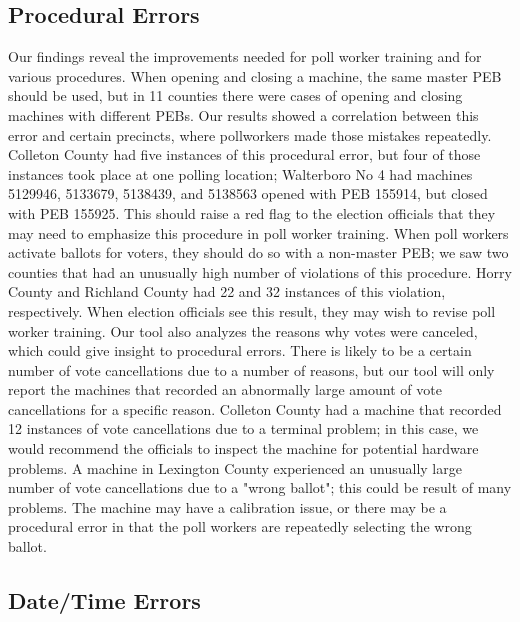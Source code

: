 \subsection{Procedural Errors}
Our findings reveal the improvements needed for poll worker training and for various procedures.  When opening and closing a machine, the same master PEB should be used, but in 11 counties there were cases of opening and closing machines with different PEBs.  Our results showed a correlation between this error and certain precincts, where pollworkers made those mistakes repeatedly.  Colleton County had five instances of this procedural error, but four of those instances took place at one polling location; Walterboro No 4 had machines 5129946, 5133679, 5138439, and 5138563 opened with PEB 155914, but closed with PEB 155925.  This should raise a red flag to the election officials that they may need to emphasize this procedure in poll worker training.  When poll workers activate ballots for voters, they should do so with a non-master PEB; we saw two counties that had an unusually high number of violations of this procedure.  Horry County and Richland County had 22 and 32 instances of this violation, respectively.  When election officials see this result, they may wish to revise poll worker training.  Our tool also analyzes the reasons why votes were canceled, which could give insight to procedural errors.  There is likely to be a certain number of vote cancellations due to a number of reasons, but our tool will only report the machines that recorded an abnormally large amount of vote cancellations for a specific reason.  Colleton County had a machine that recorded 12 instances of vote cancellations due to a terminal problem; in this case, we would recommend the officials to inspect the machine for potential hardware problems.  A machine in Lexington County experienced an unusually large number of vote cancellations due to a "wrong ballot"; this could be result of many problems.  The machine may have a calibration issue, or there may be a procedural error in that the poll workers are repeatedly selecting the wrong ballot.

\subsection{Date/Time Errors}

